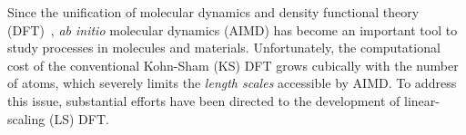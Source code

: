 \documentclass[aps,prl,reprint,amsmath,amssymb]{revtex4-1}
\newcommand*{\MAINTEXT}{}
\begin{document}
\ifdefined\MAINTEXT



Since the unification of molecular dynamics and density functional theory (DFT)~\cite{a:thecpmd},
\emph{ab initio} molecular dynamics (AIMD) has become an important tool to study processes in molecules and materials.
Unfortunately, the computational cost of the conventional Kohn-Sham (KS) DFT grows cubically with the number of atoms, which severely limits the \emph{length scales} accessible by AIMD. %
To address this issue, substantial efforts have been directed to the development of linear-scaling (LS) DFT.
\end{document}
